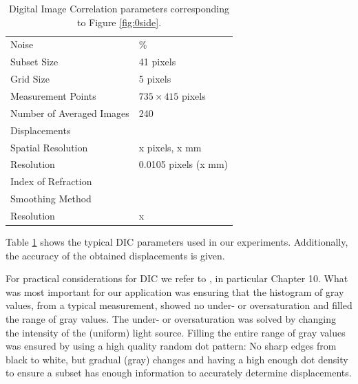 \documentclass{svjour3}                     %
\begin{document}
\begin{table}[htbp]
\caption{Digital Image Correlation parameters corresponding to Figure \ref{fig:0side}.}
\label{tab:esterrmagn}
\centering
\begin{tabular}{ll}
Noise & \% \\
Subset Size & 41 pixels \\
Grid Size 	& 5 pixels \\
Measurement Points & $735 \times 415$ pixels \\
Number of Averaged Images & 240 \\
Displacements & \\
\qquad Spatial Resolution & x pixels, x mm \\
\qquad Resolution & 0.0105 pixels (x mm) \\
Index of Refraction & \\
\qquad Smoothing Method & \\
\qquad Resolution & x \\
\end{tabular}
\end{table}

Table \ref{tab:esterrmagn} shows the typical DIC parameters used in our experiments. Additionally, the accuracy of the obtained displacements is given.

For practical considerations for DIC we refer to \cite{sutton2009image}, in particular Chapter 10. What was most important for our application was ensuring that the histogram of gray values, from a typical measurement, showed no under- or oversaturation and filled the range of gray values. The under- or oversaturation was solved by changing the intensity of the (uniform) light source. Filling the entire range of gray values was ensured by using a high quality random dot pattern: No sharp edges from black to white, but gradual (gray) changes and having a high enough dot density to ensure a subset has enough information to accurately determine displacements. %
\end{document}
